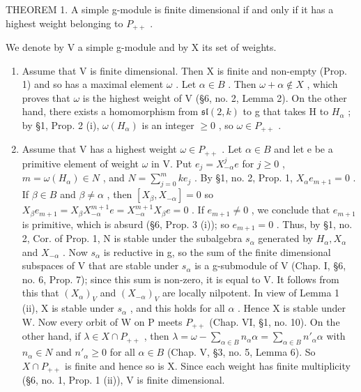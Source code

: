 THEOREM 1. A simple g-module is finite dimensional if and only if it has a highest weight belonging to \(P_{++}\) .

We denote by V a simple g-module and by X its set of weights.

\begin{enumerate}
\def\labelenumi{\alph{enumi})}
\item
  Assume that V is finite dimensional. Then X is finite and non-empty (Prop. 1) and so has a maximal element \(\omega\) . Let \(\alpha \in B\) . Then \(\omega + \alpha \notin X\) , which proves that \(\omega\) is the highest weight of V (§6, no. 2, Lemma 2). On the other hand, there exists a homomorphism from \(\mathfrak{sl}(2, k)\) to g that takes H to \(H_{\alpha}\) ; by §1, Prop. 2 (i), \(\omega(H_{\alpha})\) is an integer \(\geq 0\) , so \(\omega \in P_{++}\) .
\item
  Assume that V has a highest weight \(\omega\in P_{++}\) . Let \(\alpha\in B\) and let e be a primitive element of weight \(\omega\) in V. Put \(e_{j}=X_{-\alpha}^{j}e\) for \(j\geq0\) , \(m=\omega(H_{\alpha})\in N\) , and \(N=\sum_{j=0}^{m}ke_{j}\) . By §1, no. 2, Prop. 1, \(X_{\alpha}e_{m+1}=0\) . If \(\beta\in B\) and \(\beta\neq\alpha\) , then \([X_{\beta},X_{-\alpha}]=0\) so \(X_{\beta}e_{m+1}=X_{\beta}X_{-\alpha}^{m+1}e=X_{-\alpha}^{m+1}X_{\beta}e=0\) . If \(e_{m+1}\neq0\) , we conclude that \(e_{m+1}\) is primitive, which is absurd (§6, Prop. 3 (i)); so \(e_{m+1}=0\) . Thus, by §1, no. 2, Cor. of Prop. 1, N is stable under the subalgebra \(s_{\alpha}\) generated by \(H_{\alpha},X_{\alpha}\) and \(X_{-\alpha}\) . Now \(s_{\alpha}\) is reductive in g, so the sum of the finite dimensional subspaces of V that are stable under \(s_{\alpha}\) is a g-submodule of V (Chap. I, §6, no. 6, Prop. 7); since this sum is non-zero, it is equal to V. It follows from this that \((X_{\alpha})_{V}\) and \((X_{-\alpha})_{V}\) are locally nilpotent. In view of Lemma 1 (ii), X is stable under \(s_{\alpha}\) , and this holds for all \(\alpha\) . Hence X is stable under W. Now every orbit of W on P meets \(P_{++}\) (Chap. VI, §1, no. 10). On the other hand, if \(\lambda\in X\cap P_{++}\) , then \(\lambda=\omega-\sum_{\alpha\in B}n_{\alpha}\alpha=\sum_{\alpha\in B}n'_{\alpha}\alpha\) with \(n_{\alpha}\in N\) and \(n'_{\alpha}\geq0\) for all \(\alpha\in B\) (Chap. V, §3, no. 5, Lemma 6). So \(X\cap P_{++}\) is finite and hence so is X. Since each weight has finite multiplicity (§6, no. 1, Prop. 1 (ii)), V is finite dimensional.
\end{enumerate}


